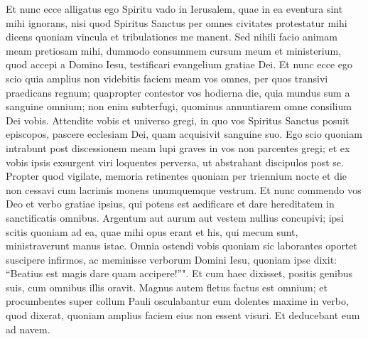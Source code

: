 \begin{biblechapter}
\verse Et nunc ecce alligatus ego Spiritu vado in Ierusalem, quae in ea eventura sint mihi ignorans,  
\verse nisi quod Spiritus Sanctus per omnes civitates protestatur mihi dicens quoniam vincula et tribulationes me manent. 
\verse Sed nihili facio animam meam pretiosam mihi, dummodo consummem cursum meum et ministerium, quod accepi a Domino Iesu, testificari evangelium gratiae Dei. 
\verse Et nunc ecce ego scio quia amplius non videbitis faciem meam vos omnes, per quos transivi praedicans regnum; 
\verse quapropter contestor vos hodierna die, quia mundus sum a sanguine omnium; 
\verse non enim subterfugi, quominus annuntiarem omne consilium Dei vobis. 
\verse Attendite vobis et universo gregi, in quo vos Spiritus Sanctus posuit episcopos, pascere ecclesiam Dei, quam acquisivit sanguine suo. 
\verse Ego scio quoniam intrabunt post discessionem meam lupi graves in vos non parcentes gregi; 
\verse et ex vobis ipsis exsurgent viri loquentes perversa, ut abstrahant discipulos post se. 
\verse Propter quod vigilate, memoria retinentes quoniam per triennium nocte et die non cessavi cum lacrimis monens unumquemque vestrum. 
\verse Et nunc commendo vos Deo et verbo gratiae ipsius, qui potens est aedificare et dare hereditatem in sanctificatis omnibus. 
\verse Argentum aut aurum aut vestem nullius concupivi; 
\verse ipsi scitis quoniam ad ea, quae mihi opus erant et his, qui mecum sunt, ministraverunt manus istae. 
\verse Omnia ostendi vobis quoniam sic laborantes oportet suscipere infirmos, ac meminisse verborum Domini Iesu, quoniam ipse dixit: “Beatius est magis dare quam accipere!”". 
\verse Et cum haec dixisset, positis genibus suis, cum omnibus illis oravit. 
\verse Magnus autem fletus factus est omnium; et procumbentes super collum Pauli osculabantur eum 
\verse dolentes maxime in verbo, quod dixerat, quoniam amplius faciem eius non essent visuri. Et deducebant eum ad navem. 
\end{biblechapter}

